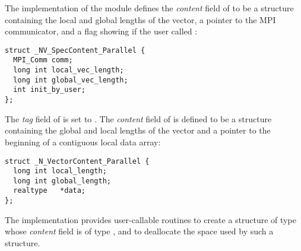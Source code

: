%
The {\nvecp} implementation of the {\nvector} module
defines the {\em content} field of  to be a structure 
containing the local and global lengths of the vector, a pointer to the MPI
communicator, and a flag showing if the user called :
\begin{verbatim}
struct _NV_SpecContent_Parallel {
  MPI_Comm comm;
  long int local_vec_length;
  long int global_vec_length;
  int init_by_user;
};
\end{verbatim}
The {\em tag} field of  is set to .
The {\em content} field of  is defined to be a structure containing
the global and local lengths of the vector and a pointer to the beginning 
of a contiguous local data array:
\begin{verbatim} 
struct _N_VectorContent_Parallel {
  long int local_length;
  long int global_length;
  realtype   *data;
};
\end{verbatim}

The {\nvecp} implementation provides user-callable routines  
to create a structure of type  whose {\em content} field is
of type , and  
to deallocate the space used by such a structure. 

